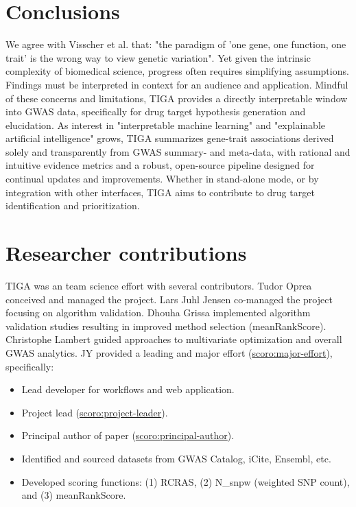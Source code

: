 \section{Conclusions}

We agree with Visscher et al. that: "the paradigm of 'one gene, one function, one trait' is the wrong way to view genetic variation"\cite{Visscher2017-jp}. Yet given the intrinsic complexity of biomedical science, progress often requires simplifying assumptions. Findings must be interpreted in context for an audience and application. Mindful of these concerns and limitations, TIGA provides a directly interpretable window into GWAS data, specifically for drug target hypothesis generation and elucidation. As interest in "interpretable machine learning" and "explainable artificial intelligence"\cite{Gilpin2018-da} grows, TIGA summarizes gene-trait associations derived solely and transparently from GWAS summary- and meta-data, with rational and intuitive evidence metrics and a robust, open-source pipeline designed for continual updates and improvements. Whether in stand-alone mode, or by integration with other interfaces, TIGA aims to contribute to drug target identification and prioritization. 


\section{Researcher contributions}

TIGA was an team science effort with several contributors. Tudor Oprea conceived and managed the project. Lars Juhl Jensen co-managed the project focusing on algorithm validation. Dhouha Grissa implemented algorithm validation studies resulting in improved method selection (meanRankScore). Christophe Lambert guided approaches to multivariate optimization and overall GWAS analytics. JY provided a leading and major effort (\href{http://purl.org/spar/scoro/major-effort}{scoro:major-effort}), specifically:

\begin{itemize}[topsep=0pt,itemsep=0pt,partopsep=0pt,parsep=0pt]
    \item Lead developer for workflows and web application.
    \item Project lead (\href{http://purl.org/spar/scoro/project-leader}{scoro:project-leader}).
    \item Principal author of paper (\href{http://purl.org/spar/scoro/principal-author}{scoro:principal-author}).
    \item Identified and sourced datasets from GWAS Catalog, iCite, Ensembl, etc.
    \item Developed scoring functions: (1) RCRAS, (2) N\_snpw (weighted SNP count), and (3) meanRankScore.
\end{itemize}

